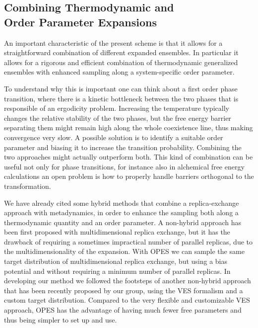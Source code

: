 \documentclass[aps,prx,reprint,superscriptaddress]{revtex4-1} %
\begin{document}
\subsection{Combining Thermodynamic and\\Order Parameter Expansions\label{S:combining}}
An important characteristic of the present scheme is that it allows for a straightforward combination of different expanded ensembles.
In particular it allows for a rigorous and efficient combination of thermodynamic generalized ensembles with enhanced sampling along a system-specific order parameter.

To understand why this is important one can think about a first order phase transition, where there is a kinetic bottleneck between the two phases that is responsible of an ergodicity problem.
Increasing the temperature typically changes the relative stability of the two phases, but the free energy barrier separating them might remain high along the whole coexistence line, thus making convergence very slow.
A possible solution is to identify a suitable order parameter and biasing it to increase the transition probability.
Combining the two approaches might actually outperform both\cite{Yang2018,Niu2019}.
This kind of combination can be useful not only for phase transitions, for instance also in alchemical free energy calculations an open problem is how to properly handle barriers orthogonal to the transformation\cite{Hahn2020}.

We have already cited some hybrid methods that combine a replica-exchange approach with metadynamics, in order to enhance the sampling both along a thermodynamic quantity and an order parameter\cite{Bussi2006,Piana2007,Bonomi2010,Nava2015,Yang2018}.
A non-hybrid approach has been first proposed with multidimensional replica exchange\cite{Sugita2000}, but it has the drawback of requiring a sometimes impractical number of parallel replicas, due to the multidimensionality of the expansion.
With OPES we can sample the same target distribution of multidimensional replica exchange, but using a bias potential and without requiring a minimum number of parallel replicas.
In developing our method we followed the footsteps of another non-hybrid approach that has been recently proposed by our group, using the VES formalism and a custom target distribution\cite{Piaggi2019cv,Niu2020}.
Compared to the very flexible and customizable VES approach, OPES has the advantage of having much fewer free parameters and thus being simpler to set up and use.
\end{document}
